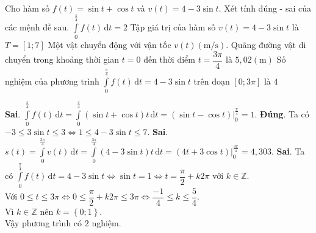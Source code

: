 \begin{ex}%
	Cho hàm số $f(t)=\sin t +\cos t$ và $v(t)=4-3 \sin t$. Xét tính đúng - sai của các mệnh đề sau.
	\choiceTF
	{$\displaystyle\int\limits_0^{\frac{\pi}{4}} f(t)\mathrm{\,d}t=2$}
	{\True Tập giá trị của hàm số $v(t)=4-3\sin t$ là $T=\left[ 1;7\right]$}
	{Một vật chuyển động với vận tốc $v(t) (\mathrm{m/s})$. Quãng đường vật di chuyển trong khoảng thời gian $t=0$ đến thời điểm $t=\dfrac{3\pi}{4}$ là $5,02 (\mathrm{m})$}
	{Số nghiệm của phương trình $\displaystyle\int\limits_0^{\frac{\pi}{4}} f(t)\mathrm{\,d}t=4-3\sin t$ trên đoạn $\left[ 0;3 \pi \right] $ là $4$}
	\loigiai
	{
		\begin{itemchoice}
			\itemch \textbf{Sai}. $\displaystyle\int\limits_0^{\frac{\pi}{4}} f(t)\mathrm{\,d}t=\displaystyle\int\limits_0^{\frac{\pi}{4}} \left( \sin t+\cos t\right) t\mathrm{\,d}t=\left. \left( \sin t-\cos t \right) \right| _0^{\frac{\pi}{4}}=1$.
			\itemch \textbf{Đúng}. Ta có $-3 \le 3\sin t \le 3 \Leftrightarrow 1 \le 4-3\sin t \le 7$.
			\itemch \textbf{Sai}. $s(t)=\displaystyle\int\limits_0^{\frac{3\pi}{4}} v(t) \mathrm{\,d}t=\displaystyle\int\limits_0^{\frac{3\pi}{4}} \left( 4-3\sin t\right) t\mathrm{\,d}t=\left. \left( 4t+3 \cos t\right) \right|_0^{\frac{3\pi}{4}}=4,303$.
			\itemch \textbf{Sai}. Ta có $\displaystyle\int\limits_0^{\frac{\pi}{4}} f(t) \mathrm{\,d}t=4-3\sin t \Leftrightarrow \sin t=1 \Leftrightarrow t=\dfrac{\pi}{2}+k2\pi$ với $k\in \mathbb{Z}$.\\
			Với $0 \le t \le 3 \pi \Leftrightarrow 0 \le \dfrac{\pi}{2}+k2\pi \le 3 \pi \Leftrightarrow \dfrac{-1}{4} \le k \le \dfrac{5}{4}$.\\
			Vì $k \in \mathbb{Z}$ nên $k=\left\lbrace 0;1 \right\rbrace $.\\
			Vậy phương trình có $2$ nghiệm.
		\end{itemchoice}
	}
\end{ex}

